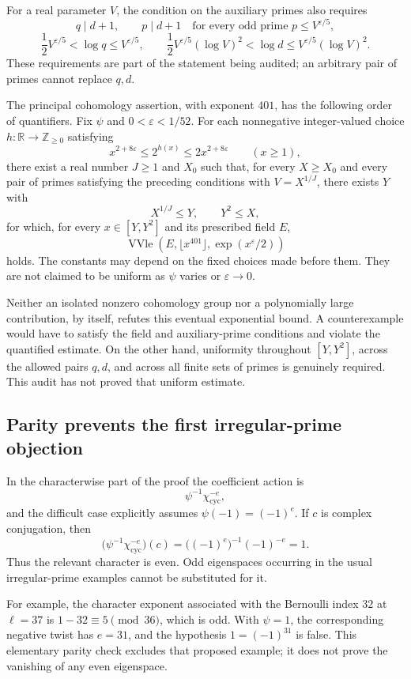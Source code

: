 \documentclass[11pt,a4paper]{article}
\theoremstyle{remark}
\newcommand{\Z}{\mathbb Z}
\newcommand{\R}{\mathbb R}
\newcommand{\src}[1]{\cite{#1}}
\begin{document}
For a real parameter $V$, the condition on the auxiliary primes also requires
\[
 q\mid d+1,\qquad
 p\mid d+1\quad
 \text{for every odd prime }p\le V^{\varepsilon/5},
\]
\[
 \frac12V^{\varepsilon/5}<\log q\le V^{\varepsilon/5},
\qquad
 \frac12V^{\varepsilon/5}(\log V)^2<\log d
       \le V^{\varepsilon/5}(\log V)^2.
\]
These requirements are part of the statement being audited; an arbitrary pair of primes cannot replace $q,d$.

The principal cohomology assertion, with exponent $401$, has the following order of quantifiers. Fix $\psi$ and $0<\varepsilon<1/52$. For each nonnegative integer-valued choice $h:\R\to\Z_{\ge0}$ satisfying
\[
 x^{2+8\varepsilon}\le 2^{h(x)}
             \le2x^{2+8\varepsilon}\qquad(x\ge1),
\]
there exist a real number $J\ge1$ and $X_0$ such that, for every $X\ge X_0$ and every pair of primes satisfying the preceding conditions with $V=X^{1/J}$, there exists $Y$ with
\[
 X^{1/J}\le Y,\qquad Y^2\le X,
\]
for which, for every $x\in[Y,Y^2]$ and its prescribed field $E$,
\[
 \operatorname{VVle}
   \left(E,\lfloor x^{401}\rfloor,\exp(x^\varepsilon/2)\right)
\]
holds. The constants may depend on the fixed choices made before them. They are not claimed to be uniform as $\psi$ varies or $\varepsilon\to0$. \src{S-vwin}

Neither an isolated nonzero cohomology group nor a polynomially large contribution, by itself, refutes this eventual exponential bound. A counterexample would have to satisfy the field and auxiliary-prime conditions and violate the quantified estimate. On the other hand, uniformity throughout $[Y,Y^2]$, across the allowed pairs $q,d$, and across all finite sets of primes is genuinely required. This audit has not proved that uniform estimate.

\subsection{Parity prevents the first irregular-prime objection}
In the characterwise part of the proof the coefficient action is
\[
 \psi^{-1}\chi_{\mathrm{cyc}}^{-e},
\]
and the difficult case explicitly assumes $\psi(-1)=(-1)^e$. If $c$ is complex conjugation, then
\[
 \bigl(\psi^{-1}\chi_{\mathrm{cyc}}^{-e}\bigr)(c)
   =\bigl((-1)^e\bigr)^{-1}(-1)^{-e}=1.
\]
Thus the relevant character is even. Odd eigenspaces occurring in the usual irregular-prime examples cannot be substituted for it.

For example, the character exponent associated with the Bernoulli index $32$ at $\ell=37$ is $1-32\equiv5\pmod{36}$, which is odd. With $\psi=1$, the corresponding negative twist has $e=31$, and the hypothesis $1=(-1)^{31}$ is false. This elementary parity check excludes that proposed example; it does not prove the vanishing of any even eigenspace. \src{S-counts}
\end{document}

